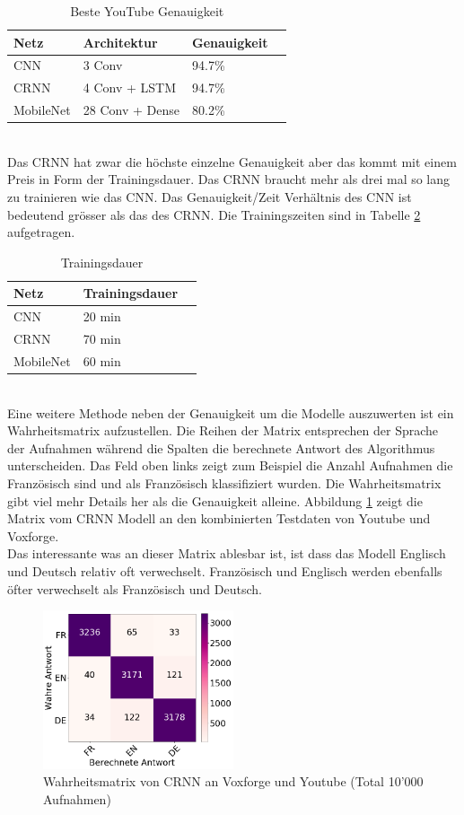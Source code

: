 \begin{table}[h]
	\centering
	\begin{tabular}{llll}
		\hline
		Netz & Architektur     & Genauigkeit  \\ \hline
		CNN  & 3 Conv          & 94.7\%       \\
		CRNN & 4 Conv + LSTM   & 94.7\%     \\
		MobileNet  & 28 Conv + Dense & 80.2\%   \\ \hline
	\end{tabular}
	\caption{Beste YouTube Genauigkeit}
	\label{table:test_you}
\end{table}
\\
Das CRNN hat zwar die höchste einzelne Genauigkeit aber das kommt mit einem Preis in Form der Trainingsdauer. Das CRNN braucht mehr als drei mal so lang zu trainieren wie das CNN. Das Genauigkeit/Zeit Verhältnis des CNN ist bedeutend grösser als das des CRNN. Die Trainingszeiten sind in Tabelle \ref{table:test_time} aufgetragen.
\begin{table}[h]
	\centering
	\begin{tabular}{lll}
		\hline
		Netz & Trainingsdauer \\ \hline
		CNN  & 20 min \\
		CRNN & 70 min \\
		MobileNet  & 60 min\\ \hline
	\end{tabular}
	\caption{Trainingsdauer}
	\label{table:test_time}
\end{table}
\\
Eine weitere Methode neben der Genauigkeit um die Modelle auszuwerten ist ein Wahrheitsmatrix aufzustellen. Die Reihen der Matrix entsprechen der Sprache der Aufnahmen während die Spalten die berechnete Antwort des Algorithmus unterscheiden. Das Feld oben links zeigt zum Beispiel die Anzahl Aufnahmen die Französisch sind und als Französisch klassifiziert wurden. Die Wahrheitsmatrix gibt viel mehr Details her als die Genauigkeit alleine. Abbildung \ref{img:matrix_vox} zeigt die Matrix vom CRNN Modell an den kombinierten Testdaten von Youtube und Voxforge.
\\
Das interessante was an dieser Matrix ablesbar ist, ist dass das Modell Englisch und Deutsch relativ oft verwechselt. Französisch und Englisch werden ebenfalls öfter verwechselt als Französisch und Deutsch.
 \begin{figure}[hbt]
	\centering
		\includegraphics[width=0.5\textwidth]{assets/matrix_voxyou_crnn.png}
	\caption{Wahrheitsmatrix von CRNN an Voxforge und Youtube (Total 10'000 Aufnahmen)}
	\label{img:matrix_vox}
\end{figure}

